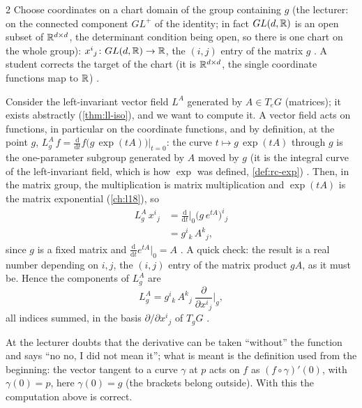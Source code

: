 \begin{paracol}{2}
Choose coordinates on a chart domain of the group containing $g$ (the lecturer: on the connected component $GL^+$ of the identity; in fact $GL(d,\mathbb{R})$ is an open subset of $\mathbb{R}^{d\times d}$, the determinant condition being open, so there is one chart on the whole group): $x^i{}_j\colon GL(d,\mathbb{R})\to\mathbb{R}$, the $(i,j)$ entry of the matrix $g$     . A student corrects the target of the chart (it is $\mathbb{R}^{d\times d}$, the single coordinate functions map to $\mathbb{R}$)  .

Consider the left-invariant vector field $L^A$ generated by $A\in T_eG$ (matrices); it exists abstractly (\cref{thm:ll-iso}), and we want to compute it. A vector field acts on functions, in particular on the coordinate functions, and by definition, at the point $g$, $L^A_g\,f=\frac{\mathrm d}{\mathrm dt}f\bigl(g\,\exp(tA)\bigr)\big|_{t=0}$: the curve $t\mapsto g\,\exp(tA)$ through $g$ is the one-parameter subgroup generated by $A$ moved by $g$ (it is the integral curve of the left-invariant field, which is how $\exp$ was defined, \cref{def:rc-exp})         . Then, in the matrix group, the multiplication is matrix multiplication and $\exp(tA)$ is the matrix exponential (\cref{ch:l18}), so
\[
  \begin{aligned}
  L^A_g\,x^i{}_j&=\tfrac{\mathrm d}{\mathrm dt}\big|_0\bigl(g\,e^{tA}\bigr)^i{}_j\\
  &=g^i{}_k\,A^k{}_j ,
  \end{aligned}
\]
since $g$ is a fixed matrix and $\frac{\mathrm d}{\mathrm dt}e^{tA}|_0=A$       . A quick check: the result is a real number depending on $i,j$, the $(i,j)$ entry of the matrix product $gA$, as it must be. Hence the components of $L^A_g$ are
\[
  L^A_g=g^i{}_k\,A^k{}_j\ \frac{\partial}{\partial x^i{}_j}\Big|_g ,
\]
all indices summed, in the basis $\partial/\partial x^i{}_j$ of $T_gG$    .
\begin{coursenote}
At  the lecturer doubts that the derivative can be taken ``without'' the function and says ``no no, I did not mean it''; what is meant is the definition used from the beginning: the vector tangent to a curve $\gamma$ at $p$ acts on $f$ as $(f\circ\gamma)'(0)$, with $\gamma(0)=p$, here $\gamma(0)=g$ (the brackets belong outside). With this the computation above is correct.      

\end{coursenote}
\end{paracol}
